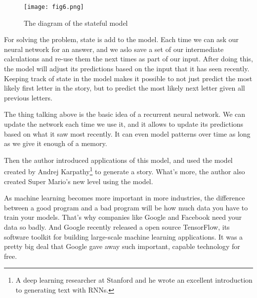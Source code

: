 \documentclass[10pt,twocolumn,letterpaper]{article}
\begin{document}
	\begin{figure}[h]
		\centering
		\texttt{[image: fig6.png]}
		\caption{The diagram of the stateful model}\label{fig6}
	\end{figure}
	\par
	For solving the problem, state is add to the model. Each time we can ask our neural network for an answer, and we aslo save a set of our intermediate calculations and re-use them the next times as part of our input. After doing this, the model will adjust its predictions based on the input that it has seen recently. Keeping track of state in the model makes it possible to not just predict the most likely first letter in the story, but to predict the most likely next letter given all previous letters.
	\par
	The thing talking above is the basic idea of a recurrent neural network. We can update the network each time we use it, and it allows to update its predictions based on what it saw most recently. It can even model patterns over time as long as we give it enough of a memory.
	\par
	Then the author introduced applications of this model, and used the model  created by Andrej Karpathy\footnote{A deep learning researcher at Stanford and he wrote an excellent introduction to generating text with RNNs.} to generate a story. What's more, the author also created Super Mario's new level using the model.
	\par
	As machine learning becomes more important in more industries, the difference between a good program and a bad program will be how much data you have to train your models. That's why companies like Google and Facebook need your data so badly. And Google recently released a open source TensorFlow, its software toolkit for building large-scale machine learning applications. It was a pretty big deal that Google gave away such important, capable technology for free. 
	
	{\small
		
		
	}
\end{document}
